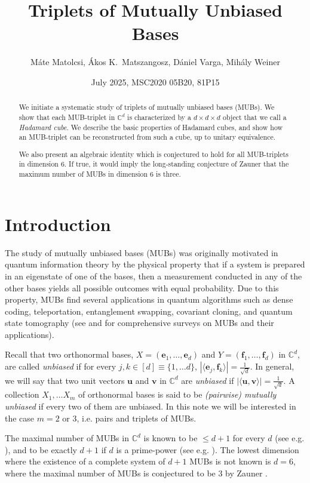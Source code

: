 \documentclass[12pt]{amsart}
\title{Triplets of Mutually Unbiased Bases}
\author{M\'ate Matolcsi, \'Akos K.\ Matszangosz, D\'aniel Varga, Mih\'aly Weiner}
\date{July 2025, MSC2020 05B20, 81P15}
\numberwithin{equation}{section}
\theoremstyle{definition}
\theoremstyle{remark}
\theoremstyle{remark}
\newcommand{\dst}{\displaystyle}
\newcommand{\Co}{\ensuremath{\mathbb{C}}}
\newcommand{\CC}{\ensuremath{\mathbb{C}}}
\newcommand{\vb}{\ensuremath{\mathbf{v}}}
\newcommand{\eb}{\ensuremath{\mathbf{e}}}
\newcommand{\fb}{\ensuremath{\mathbf{f}}}
\newcommand{\ub}{\ensuremath{\mathbf{u}}}
\begin{document}
\begin{abstract}
We initiate a systematic study of triplets of mutually unbiased bases (MUBs). We show that each MUB-triplet in $\Co^d$ is characterized by a $d\times d\times d$ object that we call a {\it Hadamard cube}. We describe the basic properties of Hadamard cubes, and show how an MUB-triplet can be reconstructed from such a cube, up to unitary equivalence. 

We also present an algebraic identity which is conjectured to hold for all MUB-triplets in dimension 6. If true, it would imply the long-standing conjecture of Zauner that the maximum number of MUBs in dimension 6 is three. 
\end{abstract}

\maketitle

\section{Introduction}

The study of mutually unbiased bases (MUBs) was originally motivated in quantum information theory  by the physical property that if a system is prepared in an eigenstate of one of the bases, then a measurement conducted in any of the  other bases yields all possible outcomes with equal probability. Due to this property, MUBs  find several applications in quantum algorithms such as dense coding, teleportation, entanglement swapping, covariant cloning, and quantum state tomography (see \cite{durt} and \cite{mweig}  for comprehensive surveys on MUBs and their applications). 

\medskip

Recall that two orthonormal bases,
$X=(\eb_1,\ldots,\eb_d)$ and $Y=(\fb_1,\ldots,\fb_d)$ in $\CC^d$, are
called \emph{unbiased} if for every $j,k\in [d]\equiv \{1,\ldots d\}$,
$|\langle \eb_j,\fb_k \rangle|=\frac{1}{\sqrt{d}}$. In general, we will say that two unit vectors $\ub$ and $\vb$ in $\CC^d$ are \emph{unbiased} if $|\langle \ub,\vb \rangle|=\dst\frac{1}{\sqrt{d}}$. A collection
$X_1,\ldots X_m$ of orthonormal bases is said to be
\emph{(pairwise) mutually unbiased} if every two of them are
unbiased. In this note we will be interested in the case $m=2$ or $3$, i.e. pairs and triplets of MUBs.

\medskip

The maximal number of MUBs in $\Co^d$ is known to be $\le d+1$ for every $d$ (see e.g. \cite{BBRV,BBELTZ,WF}), and to be exactly $d+1$ if $d$ is a prime-power (see e.g. \cite{BBRV,Iv,KR,WF}).
The lowest dimension where the existence of a complete system of $d+1$ MUBs is not known is $d=6$, where the maximal number of MUBs is conjectured to be 3 by Zauner \cite{Za}. 
\end{document}
